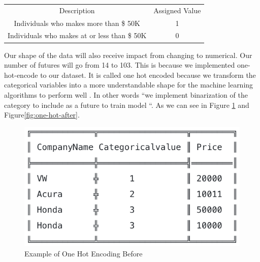 \documentclass[sigconf]{acmart}
\begin{document}
\begin{center}
\begin{tabular}{ |c|c| } 
 \hline
 Description & Assigned Value  \\ 
Individuals who makes more than \$ 50K  & 1  \\ 
Individuals who makes at or less than \$ 50K & 0  \\ 
 \hline
\end{tabular}
\end{center}

\par Our shape of the data will also receive impact from changing to numerical. Our number of futures will go from 14 to 103. This is because we implemented one-hot-encode to our dataset. It is called one hot encoded because we transform the categorical variables into a more understandable shape for the machine learning algorithms to perform well \cite{www-hackernoon}. In other words ``we implement binarization of the category to include as a future to train model \cite{www-hackernoon}``. As we can see in Figure \ref{fig:one-hot-before} and Figure\ref{fig:one-hot-after}.

 \begin{figure}[!ht]
  \centering
      \includegraphics[width=\columnwidth]{project/images/one-hot-before.png}
  \caption{Example of One Hot Encoding Before \cite{www-hackernoon}}\label{fig:one-hot-before}
\end{figure}
\end{document}
